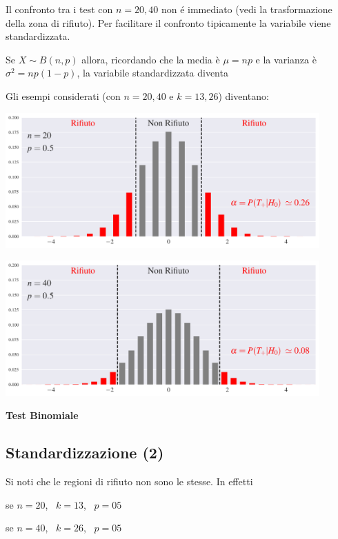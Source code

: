 \documentclass[11pt,openany]{book}
\begin{document}
Il confronto tra i test con $n=20, 40$ non é immediato (vedi la trasformazione della zona di rifiuto). Per facilitare il confronto tipicamente la variabile viene standardizzata. 

Se $X\sim B(n,p)$ allora, ricordando che la media è $\mu=np$ e la varianza è $\sigma^2=np(1-p)$, la variabile standardizzata diventa




Gli esempi considerati (con $n=20,40$ e $k=13,26$) diventano: 

\hfil\includegraphics[width=0.9\textwidth]{figure/B-test-standard_01.pdf}

\hfil\includegraphics[width=0.9\textwidth]{figure/B-test-standard_02.pdf}


\hfill{}\clearpage\hfill\textbf{Test Binomiale}
\subsection{Standardizzazione (2)}

Si noti che le regioni di rifiuto non sono le stesse. In effetti


\qquad se $n=20$, \ $k=13$, \ $p=05$


\qquad se $n=40$, \ $k=26$, \ $p=05$
\end{document}
